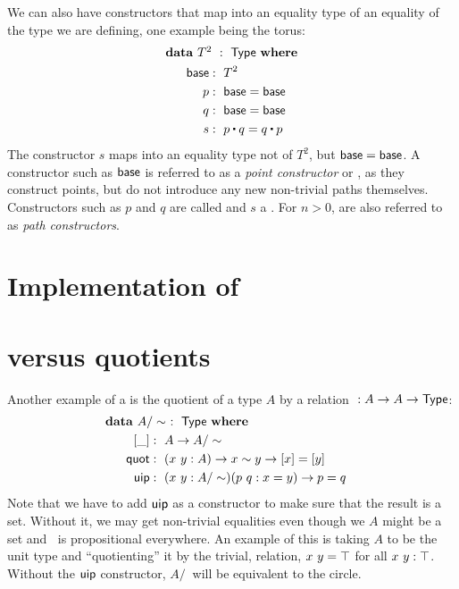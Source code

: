 \documentclass[a4paper,10pt]{report}
\begin{document}
We can also have constructors that map into an equality type of an
equality of the type we are defining, one example being the torus:
%
\begin{alignat*}{2}
  &\rlap{$\data\ T^2\ :\ \Type\ \where$} \\
  &&\ \ \base     &:\ T^2 \\
  &&\ \ p         &:\ \base = \base \\
  &&\ \ q         &:\ \base = \base \\
  &&\ \ s         &:\ p \ct q = q \ct p
\end{alignat*}
%
The constructor $s$ maps into an equality type not of $T^2$, but
$\mathsf{base} = \mathsf{base}$. A constructor such as $\mathsf{base}$ is referred to as a
\emph{point constructor} or \emph{\zeroconstructor}, as they construct
points, but do not introduce any new non-trivial paths
themselves. Constructors such as $p$ and $q$ are called
\emph{\oneconstructors} and $s$ a \emph{}. For
$n > 0$,  are also referred to as \emph{path
  constructors}.

\section{Implementation of \hits}





\section{\Hits versus quotients}
\label{sec:quotients}

Another example of a \hit is the quotient of a type $A$ by a relation
$~ : A \to A \to \mathsf{Type}$:
\begin{alignat*}{2}
  &\rlap{$\data\ A/\sim\ :\ \Type\ \where$} \\
  &&\ \ [\_]  &:\ A \to A/\sim \\
  &&\ \ \quot &:\ (x\ y : A) \to x \sim y \to [ x ] = [ y ] \\
  &&\ \ \uipc  &:\ (x\ y : A/\sim) (p\ q : x = y) \to p = q
\end{alignat*}
%
Note that we have to add $\operatorname{\mathsf{uip}}$ as a constructor to make sure that the
result is a set. Without it, we may get non-trivial equalities even
though we $A$ might be a set and $~$ is propositional everywhere. An
example of this is taking $A$ to be the unit type and ``quotienting''
it by the trivial, relation, \ie $x ~ y = \top$ for all
$x\ y : \top$. Without the $\operatorname{\mathsf{uip}}$ constructor, $A/~$ will be
equivalent to the circle.
\end{document}
